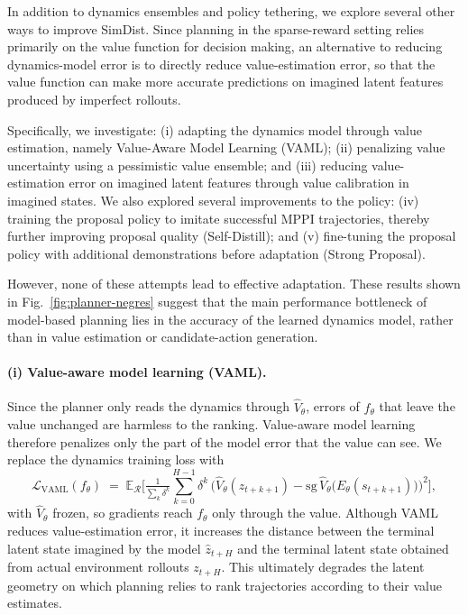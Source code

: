 \documentclass{article} %
\begin{document}
In addition to dynamics ensembles and policy tethering, we explore several other ways to improve SimDist. Since planning in the sparse-reward setting relies primarily on the value function for decision making, an alternative to reducing dynamics-model error is to directly reduce value-estimation error, so that the value function can make more accurate predictions on imagined latent features produced by imperfect rollouts.

Specifically, we investigate: (i) adapting the dynamics model through value estimation, namely Value-Aware Model Learning (VAML); (ii) penalizing value uncertainty using a pessimistic value ensemble; and (iii) reducing value-estimation error on imagined latent features through value calibration in imagined states. We also explored several improvements to the policy: (iv) training the proposal policy to imitate successful MPPI trajectories, thereby further improving proposal quality (Self-Distill); and (v) fine-tuning the proposal policy with additional demonstrations before adaptation (Strong Proposal).

However, none of these attempts lead to effective adaptation. These results shown in Fig.~\ref{fig:planner-negres} suggest that the main performance bottleneck of model-based planning lies in the accuracy of the learned dynamics model, rather than in value estimation or candidate-action generation.


\paragraph{(i) Value-aware model learning (VAML).}
Since the planner only reads the dynamics through $\hat V_\theta$, errors of $f_\theta$ that leave the value unchanged are harmless to the ranking. Value-aware model learning~\citep{farahmand2017value, farahmand2018iterative, voelcker2025calibrated} therefore penalizes only the part of the model error that the value can see. We replace the dynamics training loss with
\begin{equation}
\mathcal{L}_{\text{VAML}}(f_\theta) \;=\; \mathbb{E}_{\mathcal{R}}
\Big[\tfrac{1}{\sum_k \delta^k}\sum_{k=0}^{H-1} \delta^{k}\,
\big(\hat V_\theta(\hat z_{t+k+1}) - \mathrm{sg}\,\hat V_\theta\big(E_\theta(s_{t+k+1})\big)\big)^2\Big],
\end{equation}
with $\hat V_\theta$ frozen, so gradients reach $f_\theta$ only through the value. Although VAML reduces value-estimation error, it increases the distance between the terminal latent state imagined by the model $\hat z_{t+H}$ and the terminal latent state obtained from actual environment rollouts $z_{t+H}$. This ultimately degrades the latent geometry on which planning relies to rank trajectories according to their value estimates.
\end{document}
